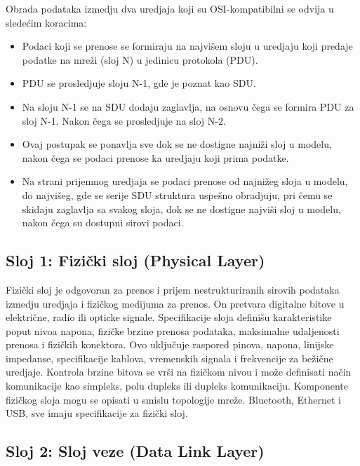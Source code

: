 \documentclass[a4paper,12pt, master]{etf}
\begin{document}
	Obrada podataka izmedju dva uredjaja koji su OSI-kompatibilni se odvija u slede\'{c}im
	koracima:
	\begin{itemize}
		\item Podaci koji se prenose se formiraju na najvi\v{s}em sloju u uredjaju koji predaje
		podatke na mre\v{z}i (sloj N) u jedinicu protokola (PDU).
		\item PDU se prosledjuje sloju N-1, gde je poznat kao SDU.
		\item Na sloju N-1 se na SDU dodaju zaglavlja, na osnovu \v{c}ega se formira PDU za sloj
		N-1. Nakon \v{c}ega se prosledjuje na sloj N-2.
		\item Ovaj postupak se ponavlja sve dok se ne dostigne najni\v{z}i sloj u modelu, nakon
		\v{c}ega se podaci prenose ka uredjaju koji prima podatke.
		\item Na strani prijemnog uredjaja se podaci prenose od najni\v{z}eg sloja u modelu, do
		najvi\v{s}eg, gde se serije SDU struktura uspe\v{s}no obradjuju, pri \v{c}emu se skidaju zaglavlja
		sa svakog sloja, dok se ne dostigne najvi\v{s}i sloj u modelu, nakon \v{c}ega su dostupni
		sirovi podaci.
	\end{itemize}

	\subsection{Sloj 1: Fizi\v{c}ki sloj (Physical Layer)}

	Fizi\v{c}ki sloj je odgovoran za prenos i prijem nestrukturiranih sirovih podataka izmedju
	uredjaja i fizi\v{c}kog medijuma za prenos. On pretvara digitalne bitove u elektri\v{c}ne, radio
	ili opticke signale. Specifikacije sloja defini\v{s}u karakteristike poput nivoa napona,
	fizi\v{c}ke brzine prenosa podataka, maksimalne udaljenosti prenosa i fizi\v{c}kih konektora. Ovo
	uklju\v{c}uje raspored pinova, napona, linijske impedanse, specifikacije kablova, vremenskih
	signala i frekvencije za be\v{z}i\v{c}ne uredjaje. Kontrola brzine bitova se vr\v{s}i na fizi\v{c}kom
	nivou i mo\v{z}e definisati na\v{c}in komunikacije kao simpleks, polu dupleks ili dupleks
	komunikaciju. Komponente fizi\v{c}kog sloja mogu se opisati u smislu topologije mre\v{z}e.
	Bluetooth, Ethernet i USB, sve imaju specifikacije za fizi\v{c}ki sloj.

	\subsection{Sloj 2: Sloj veze (Data Link Layer)}
\end{document}

